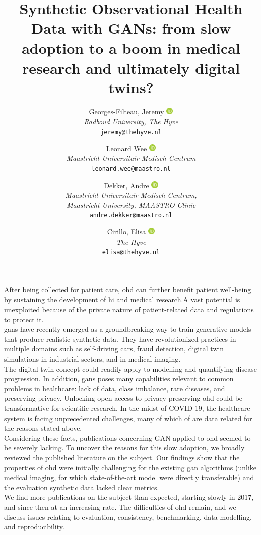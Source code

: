 \documentclass[10pt]{article}
\title{ Synthetic Observational Health Data with GANs: from slow adoption to a boom in medical research and ultimately digital twins?}
\author{
    Georges-Filteau, Jeremy \href{https://orcid.org/0000-0002-0352-6468}{\includegraphics[width=10pt]{assets/orcid.png}}\\[0.2cm]
    \small \textit{Radboud University, The Hyve}\\
    \small\texttt{jeremy@thehyve.nl}
\and
    Leonard Wee \href{https://orcid.org/0000-0003-1612-9055}{\includegraphics[width=10pt]{assets/orcid.png}}\\[0.2cm]
    \small \textit{Maastricht Universitair Medisch Centrum}\\
    \small\texttt{leonard.wee@maastro.nl}
 \and
    Dekker, Andre \href{https://http://orcid.org/0000-0002-0422-7996}{\includegraphics[width=10pt]{assets/orcid.png}}\\[0.2cm]
    \small \textit{Maastricht Universitair Medisch Centrum,}\\
    \small \textit{ Maastricht University, MAASTRO Clinic}\\
    \small \texttt{andre.dekker@maastro.nl}
  \and
    Cirillo, Elisa \href{https://orcid.org/0000-0002-0241-7833}{\includegraphics[width=10pt]{assets/orcid.png}}\\[0.2cm]
    \small \textit{The Hyve}\\
    \small \texttt{elisa@thehyve.nl}
}
\renewenvironment{abstract}
 {{\noindent\bfseries{\abstractname}\par\nobreak}\footnotesize}
 {\bigskip}
\begin{document}
    \maketitle
    \vspace{-1em}

    \begingroup
    \let\center\flushleft
    \let\endcenter\endflushleft
    \maketitle
    \endgroup


    \glsresetall
    \begin{abstract}
    After being collected for patient care, \gls{ohd} can further benefit patient well-being by sustaining the development of \gls{hi} and medical research.A vast potential is unexploited because of the private nature of patient-related data and regulations to protect it.\\
    \glspl{gan} have recently emerged as a groundbreaking way to train generative models that produce realistic synthetic data. They have revolutionized practices in multiple domains such as self-driving cars, fraud detection, digital twin simulations in industrial sectors, and in medical imaging.\\
    The digital twin concept could readily apply to modelling and quantifying disease progression. In addition, \glspl{gan} poses many capabilities relevant to common problems in healthcare: lack of data, class imbalance, rare diseases, and preserving privacy. Unlocking open access to privacy-preserving \gls{ohd} could be transformative for scientific research. In the midst of COVID-19, the healthcare system is facing unprecedented challenges, many of which of are data related for the reasons stated above.\\
    Considering these facts, publications concerning GAN applied to \gls{ohd} seemed to be severely lacking. To uncover the reasons for this slow adoption, we broadly reviewed the published literature on the subject. Our findings show that the properties of \gls{ohd} were initially challenging for the existing \gls{gan} algorithms (unlike medical imaging, for which state-of-the-art model were directly transferable) and the evaluation synthetic data lacked clear metrics.\\
    We find more publications on the subject than expected, starting slowly in 2017, and since then at an increasing rate. The difficulties of \gls{ohd} remain, and we discuss issues relating to evaluation, consistency, benchmarking, data modelling, and reproducibility. 
    \end{abstract} 

    
    
    
    
    
    

    \pagebreak

    \printglossary[type=oalgo]
    \printglossary[type=\acronymtype]

    \pagebreak

    
\end{document}
